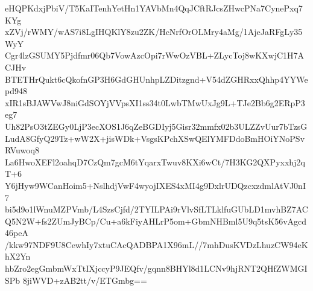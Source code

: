 eHQPKdxjPbiV/T5KaITenhYetHn1YAVbMn4QqJCftRJcsZHwcPNa7CynePxq7KYg
xZVj/rWMY/wAS7i8LgIHQKlY8zu2ZK/HcNrfOrOLMry4aMg/1AjeJaRFgLy35WyY
Cgr4lzGSUMY5Pjdfmr06Qb7VowAzcOpi7rWwOzVBL+ZLycToj8wKXwjC1H7ACJHv
BTETHrQukt6cQkofnGP3H6GdGHUnhpLZDitzgnd+V54dZGHRxxQhhp4YYWepd948
xIR1sBJAWVwJ8niGdSOYjVVpsXI1ss34t0LwbTMwUxJg9L+TJe2Bb6g2ERpP3eg7
Uh82PsO3tZEGy0LjP3ecXOS1J6qZeBGDIyj5Gisr32mmfx02b3ULZZvUur7bTzsG
LudA8GfyQ29Tz+wW2X+jisWDk+VsgsKPchXSwQElYMFDdoBmHOiYNoPSvRVuwoq8
La6HwoXEFl2oahqD7CzQm7gcM6tYqarxTwuv8KXi6wCt/7H3KG2QXPyxxhj2qT+6
Y6jHyw9WCanHoim5+NslhdjVwF4wyojIXES4xMI4g9DxlrUDQzcxzdmlAtVJ0nI7
bi5d9o1lWnuMZPVmb/L4SzsCjfd/2TYILPAi9rVlvSfLTLklfuGUbLD1mvhBZ7AC
Q5N2W+fs2ZUmJyBCp/Cu+a6kFiyAHLrP5om+GbmNHBml5U9q5tsK56vAgcd46peA
/kkw97NDF9U8CewhIy7xtuCAcQADBPA1X96mL//7mhDusKVDzLhuzCW94eKhX2Yn
hbZro2egGmbmWxTtIXjccyP9JEQfv/gqnn8BHYl8d1LCNv9hjRNT2QHfZWMGISPb
8jiWVD+zAB2tt/v/ETGmbg==
